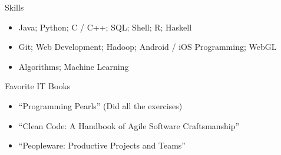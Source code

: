 \documentclass[]{mcdowellcv}
\begin{document}
	\begin{cvsection}{Skills}
		\begin{cvsubsection}{}{}{}
			\begin{itemize}
				\item Java; Python; C / C++; SQL; Shell; R; Haskell
				\item Git; Web Development; Hadoop; Android / iOS Programming; WebGL
				\item Algorithms; Machine Learning
			\end{itemize}
		\end{cvsubsection}
	\end{cvsection}
	
	\begin{cvsection}{Favorite IT Books}
		\begin{cvsubsection}{}{}{}
			\begin{itemize}
				\item ``Programming Pearls'' (Did all the exercises)
				\item ``Clean Code: A Handbook of Agile Software Craftsmanship''
				\item ``Peopleware: Productive Projects and Teams''
			\end{itemize}
		\end{cvsubsection}
	\end{cvsection}
	
\end{document}
